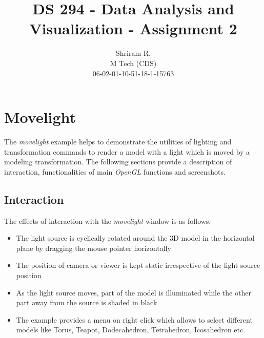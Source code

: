 \documentclass[11pt,a4paper,oneside]{article}
\begin{document}
	\title{DS 294 - Data Analysis and Visualization - Assignment 2}
	\author{Shriram R. \\ M Tech (CDS) \\ 06-02-01-10-51-18-1-15763}
	\maketitle	
	
	\section{Movelight}
	The \emph{movelight} example helps to demonstrate the utilities of lighting and transformation commands to render a model with a light which is moved by a modeling transformation. The following sections provide a description of interaction, functionalities of main \emph{OpenGL} functions and screenshots.

	\subsection{Interaction}
	The effects of interaction with the \emph{movelight} window is as follows,
	\begin{itemize}
		\item The light source is cyclically rotated around the 3D model in the horizontal plane by dragging the mouse pointer horizontally
		\item The position of camera or viewer is kept static irrespective of the light source position
		\item As the light source moves, part of the model is illuminated while the other part away from the source is shaded in black 
		\item The example provides a menu on right click which allows to select different models like Torus, Teapot, Dodecahedron, Tetrahedron, Icosahedron etc.
	\end{itemize}
\end{document}
